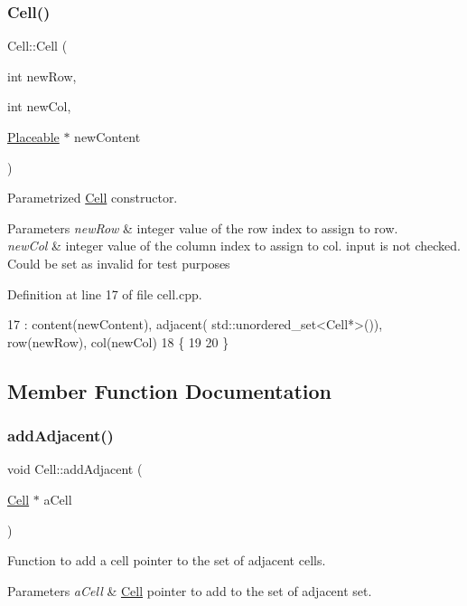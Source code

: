 \subsubsection{\texorpdfstring{Cell()}{Cell()}}
{\footnotesize\ttfamily Cell\+::\+Cell (\begin{DoxyParamCaption}\item[{int}]{new\+Row,  }\item[{int}]{new\+Col,  }\item[{\hyperlink{class_placeable}{Placeable} $\ast$}]{new\+Content }\end{DoxyParamCaption})}

Parametrized \hyperlink{class_cell}{Cell} constructor. 
\begin{DoxyParams}{Parameters}
{\em new\+Row} & integer value of the row index to assign to row. \\
\hline
{\em new\+Col} & integer value of the column index to assign to col. input is not checked. Could be set as invalid for test purposes \\
\hline
\end{DoxyParams}


Definition at line 17 of file cell.\+cpp.


\begin{DoxyCode}
17                                                         : content(newContent), adjacent(
      std::unordered\_set<Cell*>()), row(newRow), col(newCol)
18 \{
19     
20 \}
\end{DoxyCode}


\subsection{Member Function Documentation}
\hypertarget{class_cell_a90d2e75867bd5f2b553dec1498fdf4e6}{}\label{class_cell_a90d2e75867bd5f2b553dec1498fdf4e6} 
\subsubsection{\texorpdfstring{add\+Adjacent()}{addAdjacent()}}
{\footnotesize\ttfamily void Cell\+::add\+Adjacent (\begin{DoxyParamCaption}\item[{\hyperlink{class_cell}{Cell} $\ast$}]{a\+Cell }\end{DoxyParamCaption})}

Function to add a cell pointer to the set of adjacent cells. 
\begin{DoxyParams}{Parameters}
{\em a\+Cell} & \hyperlink{class_cell}{Cell} pointer to add to the set of adjacent set. \\
\hline
\end{DoxyParams}



